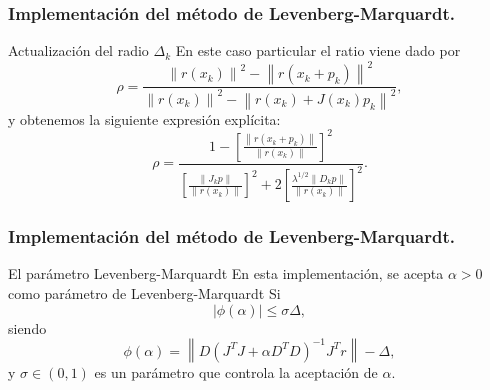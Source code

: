 \documentclass{beamer}
\newcommand{\norm}[1]{\left\lVert#1\right\rVert}
\begin{document}
\begin{frame}
    \frametitle{Implementación del método de Levenberg-Marquardt.}
    \begin{block}{Actualización del radio $\Delta_k$}
        En este caso particular el ratio viene dado por
        \begin{equation*}
	        \rho = \frac{\norm{r(x_k)}^2-\norm{r(x_k+p_k)}^2}{\norm{r(x_k)}^2-\norm{r(x_k)+J(x_k)p_k}^2},
        \end{equation*}
        y obtenemos la siguiente expresión explícita:
        \begin{equation*}
            \rho = \frac{1-\left[\frac{\norm{r(x_k+p_k)}}{\norm{r(x_k)}}\right]^2}
                        {\left[\frac{\norm{J_kp}}{\norm{r(x_k)}}\right]^2
                        + 2\left[\frac{\lambda^{1/2}\norm{D_kp}}{\norm{r(x_k)}}\right]^2}.
        \end{equation*}
    \end{block}
\end{frame}

\begin{frame}
    \frametitle{Implementación del método de Levenberg-Marquardt.}
    \begin{block}{El parámetro Levenberg-Marquardt}
        En esta implementación, se acepta $\alpha>0$ como parámetro de Levenberg-Marquardt Si
        \begin{equation*}
            |\phi(\alpha)| \leq \sigma\Delta,
        \end{equation*}
        siendo
        \begin{equation*}
            \phi(\alpha) = \norm{D(J^TJ+\alpha D^TD)^{-1}J^Tr}-\Delta,
        \end{equation*}
        y $\sigma \in (0,1)$ es un parámetro que controla la aceptación de $\alpha$. 
    \end{block}
\end{frame}
\end{document}

